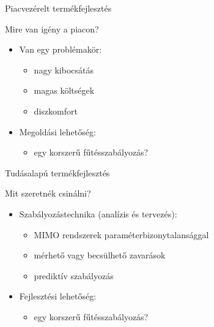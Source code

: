 \documentclass[14pt,handout]{beamer}
\begin{document}
\begin{frame}{Piacvezérelt termékfejlesztés}

Mire van igény a piacon?

\begin{itemize}
	\setlength{\itemsep}{7pt}
	\item Van egy problémakör:
	\begin{itemize}
		\item nagy kibocsátás
		\item magas költségek
		\item diszkomfort
	\end{itemize}
	\item Megoldási lehetőség:
	\begin{itemize}
		\item egy korszerű fűtésszabályozás?
	\end{itemize}
\end{itemize}
\end{frame}



\begin{frame}{Tudásalapú termékfejlesztés}

Mit szeretnék csinálni?

\begin{itemize}
	\setlength{\itemsep}{7pt}
	\item Szabályozástechnika (analízis és tervezés):
	\begin{itemize}
		\item MIMO rendszerek paraméterbizonytalansággal
		\item mérhető vagy becsülhető zavarások
		\item prediktív szabályozás
	\end{itemize}
	\item Fejlesztési lehetőség:
	\begin{itemize}
		\item egy korszerű fűtésszabályozás?
	\end{itemize}
\end{itemize}
\end{frame}
\end{document}
